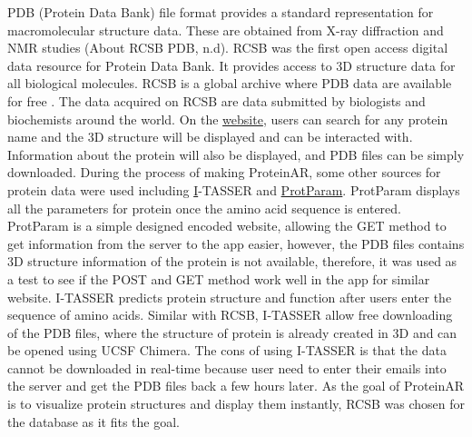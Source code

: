PDB (Protein Data Bank) file format provides a standard representation for macromolecular structure data. These are obtained from X-ray diffraction and NMR studies (About RCSB PDB, n.d).
RCSB was the first open access digital data resource for Protein Data Bank. It provides access to 3D structure data for all biological molecules. RCSB is a global archive where PDB data are available for free \parencite{noauthor_rcsb_nodate}. The data acquired on RCSB are data submitted by biologists and biochemists around the world. On the \href{https://www.rcsb.org/}{website}, users can search for any protein name and the 3D structure will be displayed and can be interacted with. Information about the protein will also be displayed, and PDB files can be simply downloaded.
During the process of making ProteinAR, some other sources for protein data were used including \href{ https://zhanglab.ccmb.med.umich.edu/I-TASSER/}I-TASSER and \href{https://web.expasy.org/protparam/} {ProtParam}. 
ProtParam displays all the parameters for protein once the amino acid sequence is entered. ProtParam is a simple designed encoded website, allowing the GET method to get information from the server to the app easier, however, the PDB files contains 3D structure information of the protein is not available, therefore, it was used as a test to see if the POST and GET method work well in the app for similar website. 
I-TASSER predicts protein structure and function after users enter the sequence of amino acids. Similar with RCSB, I-TASSER allow free downloading of the PDB files, where the structure of protein is already created in 3D and can be opened using UCSF Chimera. The cons of using I-TASSER is that the data cannot be downloaded in real-time because user need to enter their emails into the server and get the PDB files back a few hours later. 
As the goal of ProteinAR is to visualize protein structures and display them instantly, RCSB was chosen for the database as it fits the goal.  

